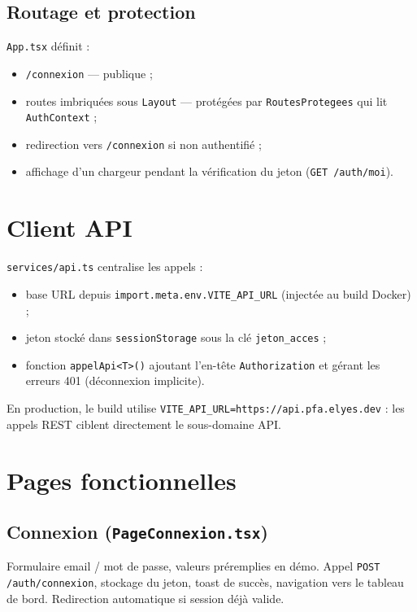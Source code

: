 \subsection{Routage et protection}

\texttt{App.tsx} définit :
\begin{itemize}
  \item \texttt{/connexion} — publique ;
  \item routes imbriquées sous \texttt{Layout} — protégées par \texttt{RoutesProtegees} qui lit \texttt{AuthContext} ;
  \item redirection vers \texttt{/connexion} si non authentifié ;
  \item affichage d'un chargeur pendant la vérification du jeton (\texttt{GET /auth/moi}).
\end{itemize}

\section{Client API}

\texttt{services/api.ts} centralise les appels :
\begin{itemize}
  \item base URL depuis \texttt{import.meta.env.VITE\_API\_URL} (injectée au build Docker) ;
  \item jeton stocké dans \texttt{sessionStorage} sous la clé \texttt{jeton\_acces} ;
  \item fonction \texttt{appelApi<T>()} ajoutant l'en-tête \texttt{Authorization} et gérant les erreurs 401 (déconnexion implicite).
\end{itemize}

En production, le build utilise \texttt{VITE\_API\_URL=https://api.pfa.elyes.dev} : les appels REST ciblent directement le sous-domaine API.

\section{Pages fonctionnelles}

\subsection{Connexion (\texttt{PageConnexion.tsx})}

Formulaire email / mot de passe, valeurs préremplies en démo. Appel \texttt{POST /auth/connexion}, stockage du jeton, toast de succès, navigation vers le tableau de bord. Redirection automatique si session déjà valide.

